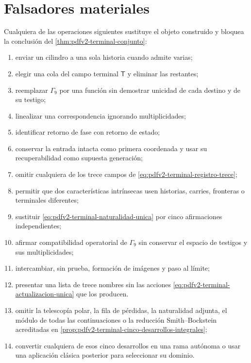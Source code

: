 \section{Falsadores materiales}

\begin{proposition}
\label{prop:pdfv2-terminal-falsadores}
Cualquiera de las operaciones siguientes sustituye el objeto construido y
bloquea la conclusi\'on del
\cref{thm:pdfv2-terminal-conjunto}:
\begin{enumerate}
 \item enviar un cilindro a una sola historia cuando admite varias;
 \item elegir una cola del campo terminal \(\mathsf T\) y eliminar las
       restantes;
 \item reemplazar \(\Gamma_9\) por una funci\'on sin demostrar unicidad de
       cada destino y de su testigo;
 \item linealizar una correspondencia ignorando multiplicidades;
 \item identificar retorno de fase con retorno de estado;
 \item conservar la entrada intacta como primera coordenada y usar su
       recuperabilidad como supuesta generaci\'on;
 \item omitir cualquiera de los trece campos de
       \eqref{eq:pdfv2-terminal-registro-trece};
 \item permitir que dos caracter\'isticas intr\'insecas usen historias,
       carries, fronteras o terminales diferentes;
 \item sustituir
       \eqref{eq:pdfv2-terminal-naturalidad-unica} por cinco afirmaciones
       independientes;
 \item afirmar compatibilidad operatorial de \(\Gamma_9\) sin conservar el
       espacio de testigos y sus multiplicidades;
 \item intercambiar, sin prueba, formaci\'on de im\'agenes y paso al l\'imite;
 \item presentar una lista de trece nombres sin las acciones
       \eqref{eq:pdfv2-terminal-actualizacion-unica} que los producen.
 \item omitir la telescopía polar, la fila de pérdidas, la naturalidad
       adjunta, el módulo de todas las continuaciones o la reducción
       Smith--Bockstein acreditadas en
       \cref{prop:pdfv2-terminal-cinco-desarrollos-integrales};
 \item convertir cualquiera de esos cinco desarrollos en una rama autónoma
       o usar una aplicación clásica posterior para seleccionar su dominio.
\end{enumerate}
\end{proposition}


